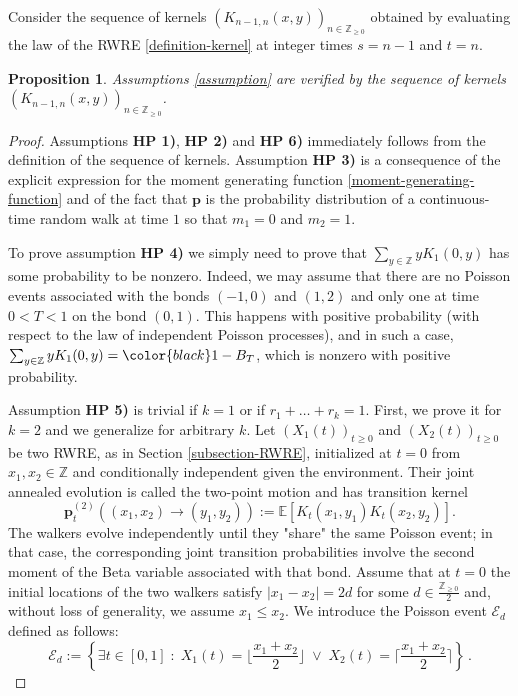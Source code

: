 \documentclass[a4paper,11pt,oneside,reqno]{amsart}
\newtheorem{proposition}[theorem]{Proposition}
\theoremstyle{definition}
\renewcommand{\leq}{\leqslant}
\renewcommand{\geq}{\geqslant}
\numberwithin{equation}{section}
\begin{document}
 {\color{black}Consider the sequence of kernels $(K_{n-1,n}(x,y))_{n\in \mathbb{Z}_{\geq 0}}$ obtained by evaluating the law of the RWRE \eqref{definition-kernel} at integer times $s=n-1$ and $t=n$. }
\begin{proposition}\label{proposition-assumptions-verify}
	Assumptions \ref{assumption} are verified by the sequence of kernels $(K_{n-1,n}(x,y))_{n\in \mathbb{Z}_{\geq 0}}$.  
\end{proposition}
\begin{proof}
Assumptions \textbf{HP 1)}, \textbf{HP 2)} and \textbf{HP 6)} immediately follows from the definition of the sequence of kernels.  Assumption \textbf{HP 3)} is a consequence of the explicit expression for  the moment generating function \eqref{moment-generating-function} and of the fact that $\mathbf{p}$ is the probability distribution of a continuous-time random walk at time $1$ so that $m_1=0$ and $m_2=1$. 

To prove assumption \textbf{HP 4)} we simply need to prove that $	\sum_{y\in \mathbb{Z}}yK_{1}(0,y)$ has some probability to be nonzero. Indeed, we may assume that there are no Poisson events associated with the bonds $(-1,0)$ and $(1,2)$ and only one at time $0<T<1$ on the bond $(0,1)$. This happens with positive probability (with respect to the law of independent Poisson processes), and in such a case, $	\sum_{y\in \mathbb{Z}}yK_{1}(0,y)= {\color{black}1-B_{T}}$, which is nonzero with positive probability. 

Assumption \textbf{HP 5)} is trivial if $k=1$ or if $r_{1}+\ldots+r_{k}=1$. First, we prove it for $k=2$ and we generalize for arbitrary $k$. 
{\color{black}Let $(X_1(t))_{t\geq 0}$ and $(X_2(t))_{t\geq 0}$ be two RWRE, as in Section \ref{subsection-RWRE}, initialized at $t=0$ from
	$x_1,x_2\in\mathbb{Z}$ and conditionally independent given the environment.
	Their joint annealed evolution is called the two-point motion and has
	transition kernel
	\begin{equation*}
		\mathbf{p}^{(2)}_t((x_1,x_2)\to(y_1,y_2))
		:=
		\mathbb{E}\left[
		K_t(x_1,y_1)K_t(x_2,y_2)
		\right].
	\end{equation*}
	The walkers evolve independently until they "share" the same Poisson
	event; in that case, the corresponding joint transition probabilities involve the second moment of the Beta variable associated with that bond.
 Assume that at $t=0$ the initial locations of the two walkers satisfy } $|x_{1}-x_{2}|=2d$ for some $d\in \frac{\mathbb{Z}_{\geq 0}}{2}$ and, without loss of generality, we assume $x_{1}\leq x_{2}$.  We introduce the Poisson event $\mathcal{E}_{d}$ defined as follows: 
\begin{equation*}
	\mathcal{E}_{d}:=\left\{\exists t \in [0,1]\;:\;X_{1}(t)=\lfloor\frac{x_{1}+x_{2}}{2}\rfloor\;\vee\;X_{2}(t)=\lceil \frac{x_{1}+x_{2}}{2}\rceil\right\}\,.
\end{equation*}


\end{proof}
\end{document}
